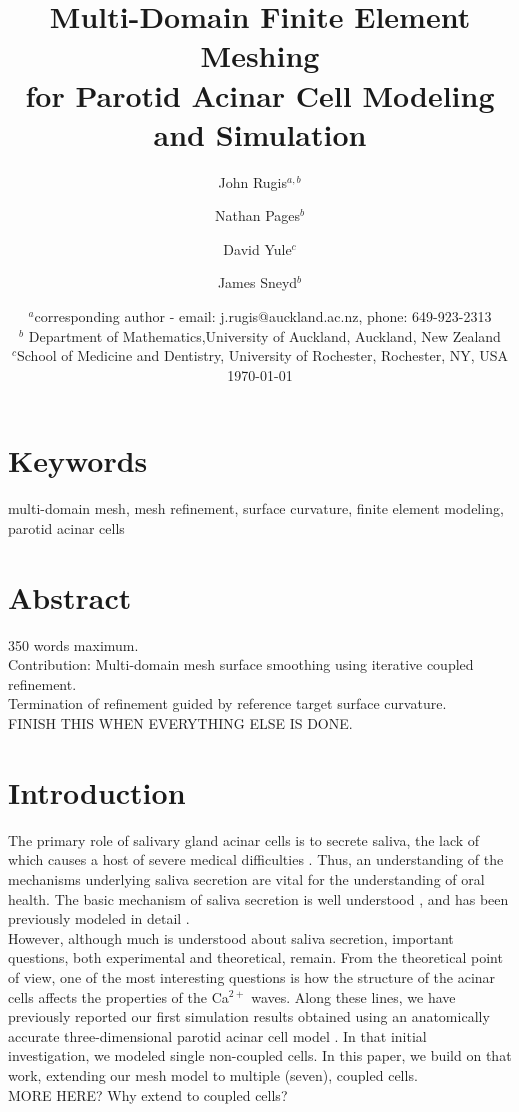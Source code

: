 \documentclass[a4paper,10pt]{article}
\title{Multi-Domain Finite Element Meshing\\for Parotid Acinar Cell Modeling and Simulation}
\author{John Rugis$^{a,b}$ \and Nathan Pages$^b$ \and David Yule$^c$ \and James Sneyd$^b$}
\date{%
  $^a$corresponding author - email: j.rugis@auckland.ac.nz, phone: 649-923-2313\\%
  $^b$ Department of Mathematics,University of Auckland, Auckland, New Zealand\\%
  $^c$School of Medicine and Dentistry, University of Rochester, Rochester, NY, USA\\[2ex]%
  \today
}
\begin{document}
\maketitle

\section*{Keywords}
multi-domain mesh, mesh refinement, surface curvature, finite element modeling, parotid acinar cells\\

\section*{Abstract}
350 words maximum.\\
Contribution: Multi-domain mesh surface smoothing using iterative coupled refinement.\\ 
Termination of refinement guided by reference target surface curvature.\\
FINISH THIS WHEN EVERYTHING ELSE IS DONE.\\  

\section{Introduction}
The primary role of salivary gland acinar cells is to secrete saliva, the lack of which causes a host of severe medical difficulties \cite{fox1985,melvin1991}. Thus, an understanding of the mechanisms underlying saliva secretion are vital for the understanding of oral health.  The basic mechanism of saliva secretion is well understood \cite{nauntofte1992}, and has been previously modeled in detail \cite{sneyd2003}.\\

However, although much is understood about saliva secretion, important questions, both experimental and theoretical, remain. From the theoretical point of view, one of the most interesting questions is how the structure of the acinar cells affects the properties of the Ca$^{2+}$ waves. Along these lines, we have previously reported our first simulation results obtained using an anatomically accurate three-dimensional parotid acinar cell model \cite{Sneyd2017383}. In that initial investigation, we modeled single non-coupled cells. In this paper, we build on that work, extending our mesh model to multiple (seven), coupled cells.\\   

MORE HERE? Why extend to coupled cells?\\
\end{document}
